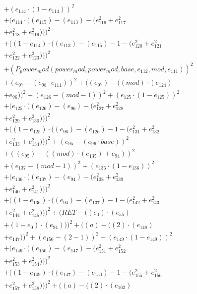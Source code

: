 \documentclass[10pt, a4paper]{article}
\begin{document}
\begin{small}
\begin{align*}
& + (e_{114}  \cdot  (1 - e_{114}))^{2} \\
& + (e_{114}  \cdot  ((e_{115}) - (e_{113}) - (e_{116}^{2} + e_{117}^{2} \\
& + e_{118}^{2} + e_{119}^{2})))^{2} \\
& + ((1 - e_{114})  \cdot  ((e_{113}) - (e_{115}) - 1 - (e_{120}^{2} + e_{121}^{2} \\
& + e_{122}^{2} + e_{123}^{2})))^{2} \\
& + (P_power_mod(power_mod, power_mod, base, e_{112}, mod, e_{111}))^{2} \\
& + (e_{97} - (e_{98}  \cdot  e_{111}))^{2} + ((e_{97}) - ((mod)  \cdot  (e_{124}) \\
& + e_{96}))^{2} + (e_{126} - (mod - 1))^{2} + (e_{125}  \cdot  (1 - e_{125}))^{2} \\
& + (e_{125}  \cdot  ((e_{126}) - (e_{96}) - (e_{127}^{2} + e_{128}^{2} \\
& + e_{129}^{2} + e_{130}^{2})))^{2} \\
& + ((1 - e_{125})  \cdot  ((e_{96}) - (e_{126}) - 1 - (e_{131}^{2} + e_{132}^{2} \\
& + e_{133}^{2} + e_{134}^{2})))^{2} + (e_{95} - (e_{96}  \cdot  base))^{2} \\
& + ((e_{95}) - ((mod)  \cdot  (e_{135}) + e_{94}))^{2} \\
& + (e_{137} - (mod - 1))^{2} + (e_{136}  \cdot  (1 - e_{136}))^{2} \\
& + (e_{136}  \cdot  ((e_{137}) - (e_{94}) - (e_{138}^{2} + e_{139}^{2} \\
& + e_{140}^{2} + e_{141}^{2})))^{2} \\
& + ((1 - e_{136})  \cdot  ((e_{94}) - (e_{137}) - 1 - (e_{142}^{2} + e_{143}^{2} \\
& + e_{144}^{2} + e_{145}^{2})))^{2} + (RET - ((e_{0})  \cdot  (e_{55}) \\
& + (1 - e_{0})  \cdot  (e_{94})))^{2} + ((a) - ((2)  \cdot  (e_{148}) \\
& + e_{147}))^{2} + (e_{150} - (2 - 1))^{2} + (e_{149}  \cdot  (1 - e_{149}))^{2} \\
& + (e_{149}  \cdot  ((e_{150}) - (e_{147}) - (e_{151}^{2} + e_{152}^{2} \\
& + e_{153}^{2} + e_{154}^{2})))^{2} \\
& + ((1 - e_{149})  \cdot  ((e_{147}) - (e_{150}) - 1 - (e_{155}^{2} + e_{156}^{2} \\
& + e_{157}^{2} + e_{158}^{2})))^{2} + ((a) - ((2)  \cdot  (e_{162}) \\

\end{align*}
\end{small}
\end{document}

